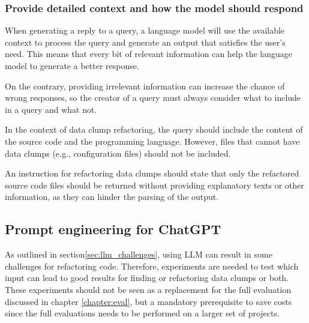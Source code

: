 \subsubsection{Provide detailed context and how the model should respond}

When generating a reply to a query, a language model will use the available context to process the query and generate an output that satisfies the user's need. This means that every bit of relevant information can help the language model to generate a better response.

On the contrary, providing irrelevant information can increase the chance of wrong responses, so the creator of a query must always consider what to include in a query and what not. 

In the context of data clump refactoring, the query should include the content of the source code and the programming language. However, files that cannot have data clumps (e.g., configuration files) should not be included.

An instruction for refactoring data clumps should state that only the refactored source code files should be returned without providing explanatory texts or other information, as they can hinder the parsing of the output. 

\begin{comment}
\subsection{Cost reduction}

Many \ac{LLM} are not for free but must be paid based on usage or other factors. Even if a \ac{LLM} is free, there are many restrictions for the data to be processed by the model, so special care needs to be taken to reduce the data size as well as possible.  The cost might already be reduced by following the steps in section \ref{sec:prompt_engineering}. Nevertheless, there are other factors that will be outlined:
\end{comment}
\subsection{Prompt engineering for ChatGPT}

As outlined in  section\ref{sec:llm_challenges}, using \ac{LLM} can result in some challenges for refactoring code. Therefore, experiments are needed to test which input can lead to good results for finding or refactoring data clumps or both. These experiments should not be seen as a replacement for the full evaluation discussed in chapter \ref{chapter:eval}, but a mandatory prerequisite to save costs since the full evaluations needs to be performed on a larger set of projects.

